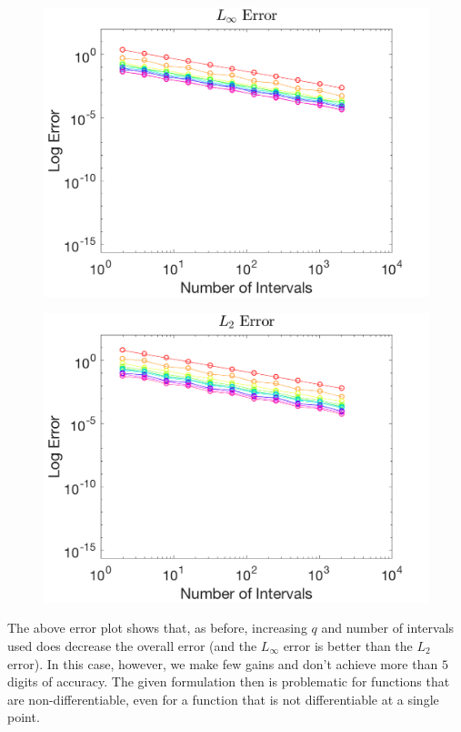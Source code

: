 \documentclass{article}
\begin{document}
\begin{figure}[H]
  \centering
  \begin{minipage}{.6\textwidth}
    \centering
    \includegraphics[width=\linewidth]{maxError_1.png}
    \label{fig:max1}
  \end{minipage}%
  \begin{minipage}{.6\textwidth}
    \centering
    \includegraphics[width=\linewidth]{squareError_1.png}
    \label{fig:square1}
  \end{minipage}%
\end{figure}

\noindent The above error plot shows that, as before, increasing $q$ and number of intervals used does decrease the overall error (and the $L_\infty$ error is better than the $L_2$ error). In this case, however, we make few gains and don't achieve more than $5$ digits of accuracy. The given formulation then is problematic for functions that are non-differentiable, even for a function that is not differentiable at a single point.
\end{document}

